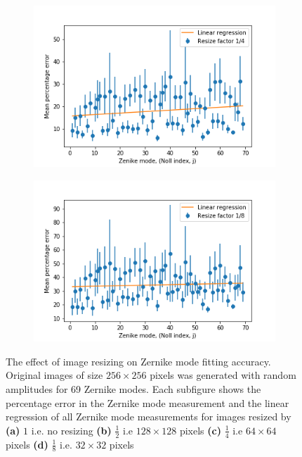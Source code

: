 \begin{figure}[h]
	\begin{subfigure}{0.48\textwidth}
		\centering
		\includegraphics[width=\linewidth]{images/Zernike_fitting_percentage_error_random_modes_repeat_resize_factor_4.png}
		\caption{}
		\label{fig:Zernike_fitting_percentage_error_random_modes_repeat_resize_factor_4}
	\end{subfigure}
	\begin{subfigure}{0.48\textwidth}
		\centering
		\includegraphics[width=\linewidth]{images/Zernike_fitting_percentage_error_random_modes_repeat_resize_factor_8.png}
		\caption{}
		\label{fig:Zernike_fitting_percentage_error_random_modes_repeat_resize_factor_8}
	\end{subfigure}
	\caption[The effect of image resizing on Zernike mode fitting 	
	accuracy]{The effect of image resizing on Zernike mode fitting accuracy. 
		Original images of size $256\times256$ pixels was generated with 
		random amplitudes for 69 Zernike modes. Each subfigure shows the 
		percentage error in the Zernike mode measurement and the linear 
		regression of all Zernike mode measurements for images resized by 
		\textbf{(a)} $1$ i.e. no resizing \textbf{(b)} $\frac{1}{2}$ i.e 
		$128\times128$ pixels \textbf{(c)} $\frac{1}{4}$ i.e $64\times64$ 
		pixels \textbf{(d)} $\frac{1}{8}$ i.e. $32\times32$ pixels}
	\label{fig:zernike_fitting_accuracy_resize}
\end{figure}

